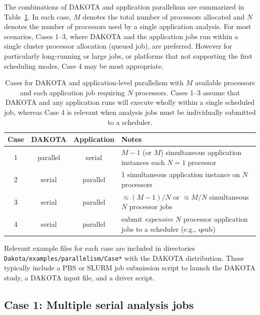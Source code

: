The combinations of DAKOTA and application parallelism are summarized
in Table~\ref{parallel:application:table01}.  In each case, $M$
denotes the total number of processors allocated and $N$ denotes the
number of processors used by a single application analysis.  For most
scenarios, Cases 1--3, where DAKOTA and the application jobs run
within a single cluster processor allocation (queued job), are
preferred.  However for particularly long-running or large jobs, or
platforms that not supporting the first scheduling modes, Case 4 may
be most appropriate.
\begin{table}
  \centering
  \caption{Cases for DAKOTA and application-level parallelism with $M$
  available processors and each application job requiring $N$
  processors.  Cases 1--3 assume that DAKOTA and any application runs
  will execute wholly within a single scheduled job, whereas Case 4 is
  relevant when analysis jobs must be individually submitted to a
  scheduler.}
  \label{parallel:application:table01}\vspace{2mm}
  \begin{tabular}{c|c|c|l}
    {\bf Case} & {\bf DAKOTA} & {\bf Application} & {\bf Notes} \\
    \hline 1 & parallel & serial & $M-1$ (or $M$) simultaneous
    application instances each $N=1$ processor \\ 2 & serial &
    parallel & 1 simultaneous application instance on $N$ processors
    \\ 3 & serial & parallel & $\approx (M-1)/N$ or $\approx M/N$
    simultaneous $N$ processor jobs \\ 4 & serial & parallel & submit
    {\em expensive} $N$ processor application jobs to a scheduler
    (e.g., qsub) \\ \hline
  \end{tabular}
\end{table}

Relevant example files for each case are included in directories {\tt
Dakota/examples/parallelism/Case*} with the DAKOTA distribution.
These typically include a PBS or SLURM job submission script to launch
the DAKOTA study, a DAKOTA input file, and a driver script.

\subsection{Case 1: Multiple serial analysis jobs}

